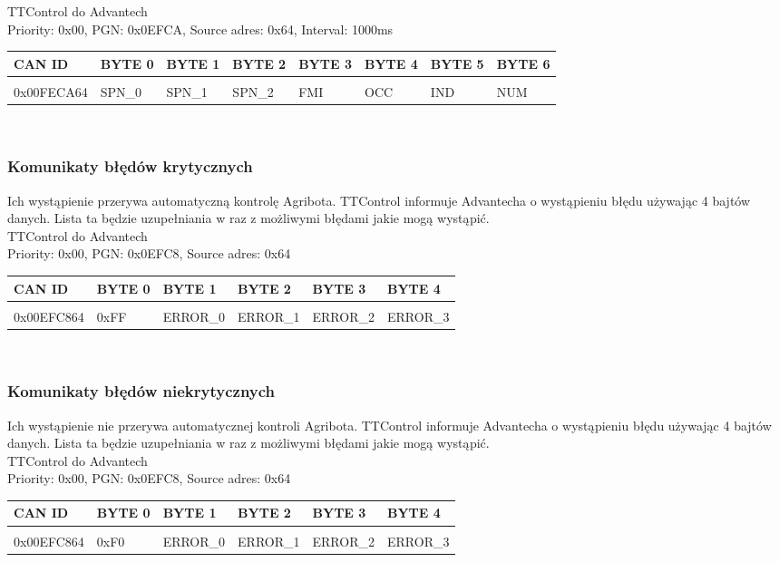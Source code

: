 \documentclass{article}
\begin{document}
TTControl do Advantech\\
Priority: 0x00, PGN: 0x0EFCA, Source adres: 0x64, Interval: 1000ms\\
\begin{left}
\begin{tabular}{ |p{2cm}|p{1.7cm}|p{1.7cm}|p{1.7cm}|p{1.7cm}|p{1.7cm}|p{1.7cm}|p{1.7cm}|} 
 \hline
 CAN ID & BYTE 0 & BYTE 1 & BYTE 2 & BYTE 3 & BYTE 4 & BYTE 5 & BYTE 6\\ \hline
 & & & & & & & \\
0x00FECA64 & SPN\_0 & SPN\_1 & SPN\_2 & FMI & OCC & IND & NUM\\ 
 \hline
\end{tabular}
\end{left}\\

\subsubsection{Komunikaty błędów krytycznych}
Ich wystąpienie przerywa automatyczną kontrolę Agribota. TTControl informuje Advantecha o wystąpieniu błędu używając 4 bajtów danych. Lista ta będzie uzupełniania w raz z możliwymi błędami jakie mogą wystąpić.\\
TTControl do Advantech\\
Priority: 0x00, PGN: 0x0EFC8, Source adres: 0x64\\
\begin{left}
\begin{tabular}{ |p{2cm}|p{1.5cm}|p{1.5cm}|p{1.5cm}|p{1.5cm}|p{1.5cm}|}  
 \hline
 CAN ID & BYTE 0 & BYTE 1  & BYTE 2 & BYTE 3 & BYTE 4\\ \hline
 & & & & &\\
 0x00EFC864 & 0xFF & ERROR\_0 & ERROR\_1 & ERROR\_2 & ERROR\_3\\ 
 \hline
\end{tabular}
\end{left}\\

\subsubsection{Komunikaty błędów niekrytycznych}
Ich wystąpienie nie przerywa automatycznej kontroli Agribota. TTControl informuje Advantecha o wystąpieniu błędu używając 4 bajtów danych. Lista ta będzie uzupełniania w raz z możliwymi błędami jakie mogą wystąpić.\\
TTControl do Advantech\\
Priority: 0x00, PGN: 0x0EFC8, Source adres: 0x64\\
\begin{left}
\begin{tabular}{ |p{2cm}|p{1.5cm}|p{1.5cm}|p{1.5cm}|p{1.5cm}|p{1.5cm}|}  
 \hline
 CAN ID & BYTE 0 & BYTE 1  & BYTE 2 & BYTE 3 & BYTE 4\\ \hline
 & & & & &\\
 0x00EFC864 & 0xF0 & ERROR\_0 & ERROR\_1 & ERROR\_2 & ERROR\_3\\ 
 \hline
\end{tabular}
\end{left}\\
\end{document}
